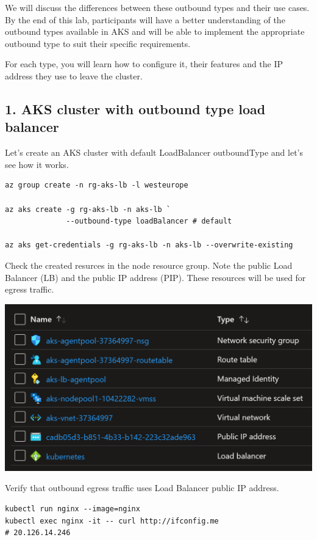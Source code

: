 \documentclass[
]{article}
\begin{document}
We will discuss the differences between these outbound types and their
use cases. By the end of this lab, participants will have a better
understanding of the outbound types available in AKS and will be able to
implement the appropriate outbound type to suit their specific
requirements.

For each type, you will learn how to configure it, their features and
the IP address they use to leave the cluster.

\hypertarget{aks-cluster-with-outbound-type-load-balancer}{%
\subsection{1. AKS cluster with outbound type load
balancer}\label{aks-cluster-with-outbound-type-load-balancer}}

Let's create an AKS cluster with default LoadBalancer outboundType and
let's see how it works.

\begin{lstlisting}
az group create -n rg-aks-lb -l westeurope

az aks create -g rg-aks-lb -n aks-lb `
              --outbound-type loadBalancer # default

az aks get-credentials -g rg-aks-lb -n aks-lb --overwrite-existing
\end{lstlisting}

Check the created resurces in the node resource group. Note the public
Load Balancer (LB) and the public IP address (PIP). These resources will
be used for egress traffic.

\includegraphics{images/65_aks_egress_lb_natgw_udr__lb-resources.png}

Verify that outbound egress traffic uses Load Balancer public IP
address.

\begin{lstlisting}
kubectl run nginx --image=nginx
kubectl exec nginx -it -- curl http://ifconfig.me
# 20.126.14.246
\end{lstlisting}
\end{document}
